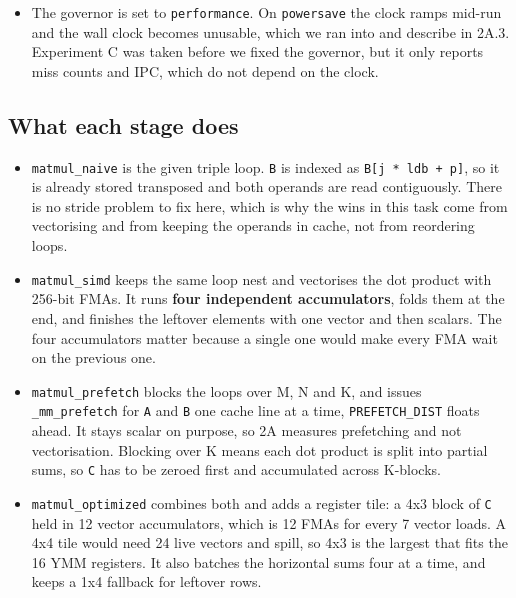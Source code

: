 \documentclass[
  10pt,
]{article}
\providecommand{\tightlist}{%
  \setlength{\itemsep}{0pt}\setlength{\parskip}{0pt}}
\begin{document}
\begin{itemize}
\tightlist
\item
  The governor is set to \texttt{performance}. On \texttt{powersave} the clock
  ramps mid-run and the wall clock becomes unusable, which we ran into and
  describe in 2A.3. Experiment C was taken before we fixed the governor, but it
  only reports miss counts and IPC, which do not depend on the clock.
\end{itemize}
\subsection{What each stage does}\label{stages2}

\begin{itemize}
\item
  \texttt{matmul\_naive} is the given triple loop. \texttt{B} is indexed as
  \texttt{B[j * ldb + p]}, so it is already stored transposed and both operands
  are read contiguously. There is no stride problem to fix here, which is why
  the wins in this task come from vectorising and from keeping the operands in
  cache, not from reordering loops.

\item
  \texttt{matmul\_simd} keeps the same loop nest and vectorises the dot product
  with 256-bit FMAs. It runs \textbf{four independent accumulators}, folds them
  at the end, and finishes the leftover elements with one vector and then
  scalars. The four accumulators matter because a single one would make every
  FMA wait on the previous one.

\item
  \texttt{matmul\_prefetch} blocks the loops over M, N and K, and issues
  \texttt{\_mm\_prefetch} for \texttt{A} and \texttt{B} one cache line at a time,
  \texttt{PREFETCH\_DIST} floats ahead. It stays scalar on purpose, so 2A
  measures prefetching and not vectorisation. Blocking over K means each dot
  product is split into partial sums, so \texttt{C} has to be zeroed first and
  accumulated across K-blocks.

\item
  \texttt{matmul\_optimized} combines both and adds a register tile: a 4x3 block
  of \texttt{C} held in 12 vector accumulators, which is 12 FMAs for every 7
  vector loads. A 4x4 tile would need 24 live vectors and spill, so 4x3 is the
  largest that fits the 16 YMM registers. It also batches the horizontal sums
  four at a time, and keeps a 1x4 fallback for leftover rows.
\end{itemize}
\end{document}

